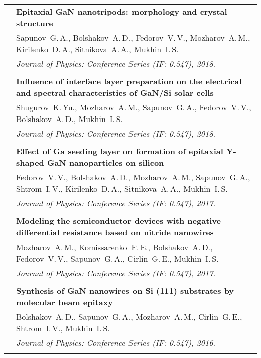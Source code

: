 \documentclass[letterpaper, 11pt]{article}
\begin{document}
\begin{longtable}{p{1.3in}p{4.8in}}
        & \textbf{Epitaxial GaN nanotripods: morphology and crystal structure}
        \\
        & Sapunov~G.\,A., Bolshakov~A.\,D., Fedorov~V.\,V.,  Mozharov~A.\,M.,
        Kirilenko~D.\,A., Sitnikova~A.\,A., Mukhin~I.\,S. \\
		& \textit{Journal of Physics: Conference Series (IF: 0.547), 2018.}\\
		& \\
		
        & \textbf{Influence of interface layer preparation on the electrical
        and spectral characteristics of GaN/Si solar cells} \\
        & Shugurov~K.\,Yu., Mozharov~A.\,M., Sapunov~G.\,A., Fedorov~V.\,V.,
        Bolshakov~A.\,D., Mukhin~I.\,S. \\
		& \textit{Journal of Physics: Conference Series (IF: 0.547), 2018.}\\
		& \\
		
        & \textbf{Effect of Ga seeding layer on formation of epitaxial Y-shaped
        GaN nanoparticles on silicon} \\
        & Fedorov~V.\,V., Bolshakov~A.\,D., Mozharov~A.\,M., Sapunov~G.\,A.,
        Shtrom~I.\,V., Kirilenko~D.\,A., Sitnikova~A.\,A., Mukhin~I.\,S. \\
        & \textit{Journal of Physics: Conference Series (IF: 0.547), 2017.}\\
		& \\

        & \textbf{Modeling the semiconductor devices with negative differential
        resistance based on nitride nanowires} \\
        & Mozharov~A.\,M., Komissarenko~F.\,E., Bolshakov~A.\,D.,
        Fedorov~V.\,V., Sapunov~G.\,A., Cirlin~G.\,E., Mukhin~I.\,S. \\
		& \textit{Journal of Physics: Conference Series (IF: 0.547), 2017.}\\
		& \\

        & \textbf{Synthesis of GaN nanowires on Si (111) substrates by
        molecular beam epitaxy} \\
        & Bolshakov~A.\,D., Sapunov~G.\,A., Mozharov~A.\,M., Cirlin~G.\,E.,
        Shtrom~I.\,V., Mukhin~I.\,S. \\
        & \textit{Journal of Physics: Conference Series (IF: 0.547), 2016.}\\
		& \\


\end{longtable}
\end{document}
